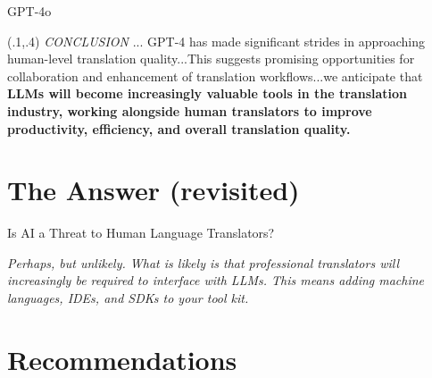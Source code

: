 \documentclass{beamer}
\begin{document}
\begin{frame}{GPT-4o}


\begin{textblock}{1}(.1,.4)
  \small {\textit{CONCLUSION} ... GPT-4 has made significant strides in approaching human-level translation quality...This suggests promising opportunities for collaboration and enhancement of translation workflows...we anticipate that \textbf{LLMs will become increasingly valuable tools in the translation industry, working alongside human translators to improve productivity, efficiency, and overall translation quality.}}
\end{textblock}

\end{frame}

\section{The Answer (revisited)}

\begin{frame}{Is AI a Threat to Human Language Translators?}

\large \textit{Perhaps, but unlikely. What is likely is that professional translators will increasingly be required to interface with LLMs. This means adding machine languages, IDEs, and SDKs to your tool kit.}

\end{frame}


\section{Recommendations}
\end{document}
